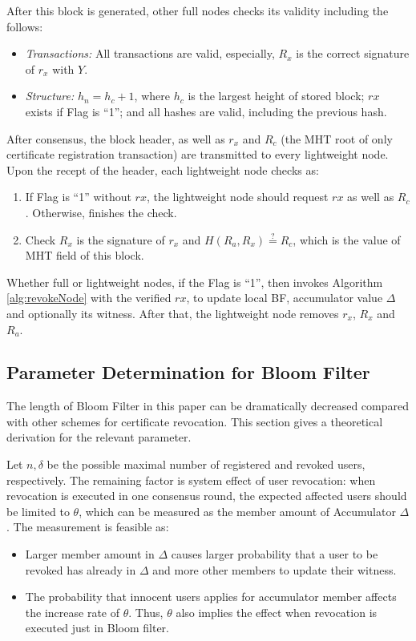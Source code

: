 \documentclass[conference]{IEEEtran}
\begin{document}
After this block is generated, other full nodes checks its validity including the follows:
\begin{itemize}
	\item \textit{Transactions:} All transactions are valid, especially, $R_x$ is the correct signature of $r_x$ with $Y$.
	\item \textit{Structure:} $h_n = h_c + 1$, where $h_c$ is the largest height of stored block; $rx$ exists if Flag is ``1''; and all hashes are valid, including the previous hash.
\end{itemize}

After consensus, the block header, as well as $r_x$ and $R_c$ (the MHT root of only certificate registration transaction) are transmitted to every lightweight node. 
Upon the recept of the header, each lightweight node checks as: 
\begin{enumerate}
	\item If Flag is ``1'' without $rx$, the lightweight node should request $rx$ as well as $R_c$. Otherwise, finishes the check.
	\item  Check $R_x$ is the signature of $r_x$ and $H(R_a, R_x) \overset{?}{=} R_c$, which is the value of MHT field of this block. 
\end{enumerate}

Whether full or lightweight nodes, if the Flag is ``1'', then invokes Algorithm \ref{alg:revokeNode} with the verified $rx$, to update local BF, accumulator value $\Delta$ and optionally its witness.
After that, the lightweight node removes $r_x$, $R_x$ and $R_a$.

\subsection{Parameter Determination for Bloom Filter} \label{section:parameter}

The length of Bloom Filter in this paper can be dramatically decreased compared with other schemes for certificate revocation. This section gives a theoretical derivation for the relevant parameter.

Let $n, \delta$ be the possible maximal number of registered and revoked users, respectively. The remaining factor is system effect of user revocation: when revocation is executed in one consensus round, the expected affected users should be limited to $\theta$, which can be measured as the member amount of Accumulator $\Delta$. The measurement is feasible as:
\begin{itemize}
    \item Larger member amount in $\Delta$ causes larger probability that a user to be revoked has already in $\Delta$ and more other members to update their witness.
    \item The probability that innocent users applies for accumulator member affects the increase rate of $\theta$. Thus, $\theta$ also implies the effect when revocation is executed just in Bloom filter.
\end{itemize}
\end{document}
